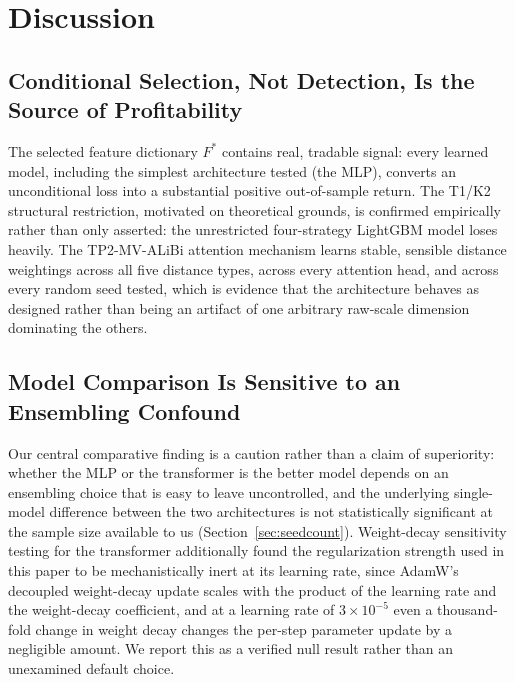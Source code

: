 \documentclass[sigconf,review,anonymous]{acmart}
\begin{document}
\section{Discussion}
\label{sec:discussion}

\subsection{Conditional Selection, Not Detection, Is the Source of Profitability}
The selected feature dictionary $F^{\ast}$ contains real, tradable signal: every learned model, including the simplest architecture tested (the MLP), converts an unconditional loss into a substantial positive out-of-sample return. The T1/K2 structural restriction, motivated on theoretical grounds, is confirmed empirically rather than only asserted: the unrestricted four-strategy LightGBM model loses heavily. The TP2-MV-ALiBi attention mechanism learns stable, sensible distance weightings across all five distance types, across every attention head, and across every random seed tested, which is evidence that the architecture behaves as designed rather than being an artifact of one arbitrary raw-scale dimension dominating the others.

\subsection{Model Comparison Is Sensitive to an Ensembling Confound}
Our central comparative finding is a caution rather than a claim of superiority: whether the MLP or the transformer is the better model depends on an ensembling choice that is easy to leave uncontrolled, and the underlying single-model difference between the two architectures is not statistically significant at the sample size available to us (Section~\ref{sec:seedcount}). Weight-decay sensitivity testing for the transformer additionally found the regularization strength used in this paper to be mechanistically inert at its learning rate, since AdamW's decoupled weight-decay update scales with the product of the learning rate and the weight-decay coefficient, and at a learning rate of $3\times10^{-5}$ even a thousand-fold change in weight decay changes the per-step parameter update by a negligible amount. We report this as a verified null result rather than an unexamined default choice.
\end{document}
